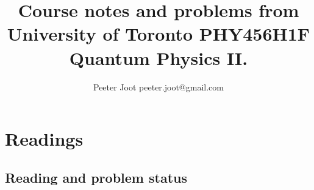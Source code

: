 \documentclass[12pt,leqno]{book}
\begin{document}

\title{Course notes and problems from\\University of Toronto PHY456H1F\\Quantum Physics II.}
\author{Peeter Joot \quad peeter.joot@gmail.com}

\maketitle

\clearpage{}
\tableofcontents

\clearpage{}

\pagestyle{plain}



\part{Readings}

\chapter{Reading and problem status}
\end{document}
